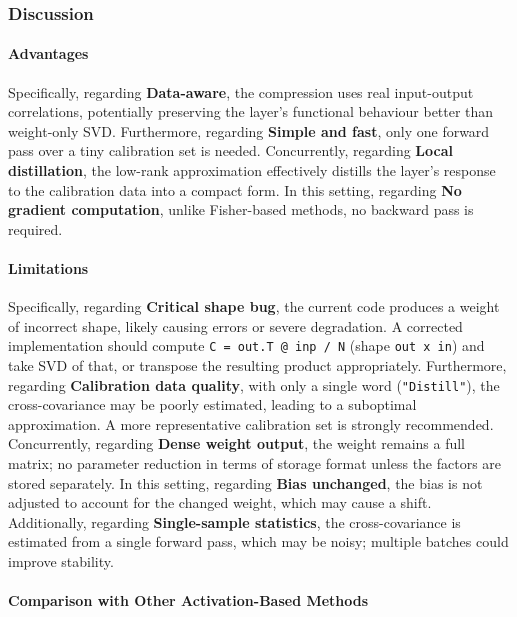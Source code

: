 \subsubsection*{Discussion}

\paragraph{Advantages}

Specifically, regarding \textbf{Data-aware}, the compression uses real input-output correlations, potentially preserving the layer's functional behaviour better than weight-only SVD. Furthermore, regarding \textbf{Simple and fast}, only one forward pass over a tiny calibration set is needed. Concurrently, regarding \textbf{Local distillation}, the low-rank approximation effectively distills the layer's response to the calibration data into a compact form. In this setting, regarding \textbf{No gradient computation}, unlike Fisher-based methods, no backward pass is required.


\paragraph{Limitations}

Specifically, regarding \textbf{Critical shape bug}, the current code produces a weight of incorrect shape, likely causing errors or severe degradation. A corrected implementation should compute \texttt{C = out.T @ inp / N} (shape \texttt{out x in}) and take SVD of that, or transpose the resulting product appropriately. Furthermore, regarding \textbf{Calibration data quality}, with only a single word (\texttt{"Distill"}), the cross-covariance may be poorly estimated, leading to a suboptimal approximation. A more representative calibration set is strongly recommended. Concurrently, regarding \textbf{Dense weight output}, the weight remains a full matrix; no parameter reduction in terms of storage format unless the factors are stored separately. In this setting, regarding \textbf{Bias unchanged}, the bias is not adjusted to account for the changed weight, which may cause a shift. Additionally, regarding \textbf{Single-sample statistics}, the cross-covariance is estimated from a single forward pass, which may be noisy; multiple batches could improve stability.


\paragraph{Comparison with Other Activation-Based Methods}

